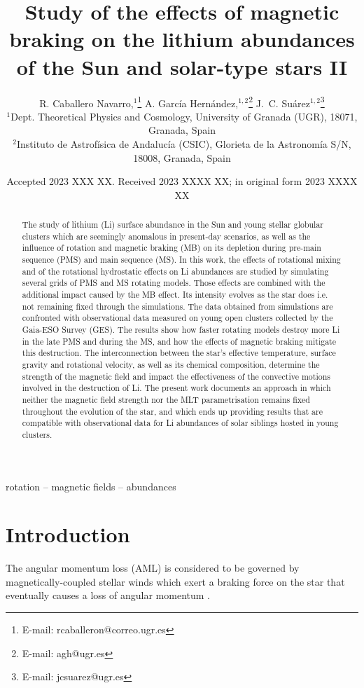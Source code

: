 \documentclass[fleqn,usenatbib]{mnras}
\title[Rotation, magnetic braking \& Li abundances II]{Study of the effects of magnetic braking on the lithium abundances of the Sun and solar-type stars II}
\author[R. Caballero Navarro et al.]{
R. Caballero Navarro,$^{1}$\thanks{E-mail: rcaballeron@correo.ugr.es}
A. Garc\'ia Hern\'andez,$^{1,2}$\thanks{E-mail: agh@ugr.es}
J.~C. Su\'arez$^{1,2}$\thanks{E-mail: jcsuarez@ugr.es}
\\
$^{1}$Dept. Theoretical Physics and Cosmology, University of Granada (UGR), 18071, Granada, Spain\\
$^{2}$Instituto de Astrof\'isica de Andaluc\'ia (CSIC), Glorieta de la Astronom\'ia S/N, 18008, Granada, Spain\\
}
\date{Accepted 2023 XXX XX. Received 2023 XXXX XX; in original form 2023 XXXX XX}
\begin{document}
\label{firstpage}
\pagerange{\pageref{firstpage}--\pageref{lastpage}}
\maketitle

\begin{abstract}
The study of lithium (Li) surface abundance in the Sun and young stellar globular clusters which are seemingly anomalous in present-day scenarios, as well as the influence of rotation and magnetic braking (MB) on its depletion during pre-main sequence (PMS) and main sequence (MS).
In this work, the effects of rotational mixing and of the rotational hydrostatic effects on Li abundances are studied by simulating several grids of PMS and MS rotating models. Those effects are combined with the additional impact caused by the MB effect. Its intensity evolves as the star does i.e. not remaining fixed through the simulations. The data obtained from simulations are confronted with observational data measured on young open clusters collected by the Gaia-ESO Survey (GES). The results show how faster rotating models destroy more Li in the late PMS and during the MS, and how the effects of magnetic braking mitigate this destruction. The interconnection between the star's effective temperature, surface gravity and rotational velocity, as well as its chemical composition, determine the strength of the magnetic field and impact the effectiveness of the convective motions involved in the destruction of Li. The present work documents an approach in which neither the magnetic field strength nor the MLT parametrisation remains fixed throughout the evolution of the star, and which ends up providing results that are compatible with observational data for Li abundances of solar siblings hosted in young clusters.

\end{abstract}

\begin{keywords}
rotation -- magnetic fields -- abundances
\end{keywords}



\section{Introduction} \label{sec_intro}
The angular momentum loss (AML) is considered to be governed by magnetically-coupled stellar winds which exert a braking force on the star that eventually causes a loss of angular momentum \citep{UdDoula2002}.
\end{document}
